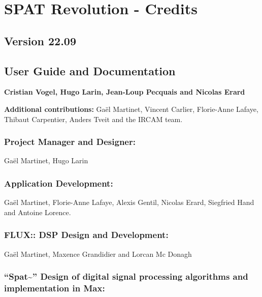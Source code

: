 \documentclass[
  letterpaper,
  DIV=11,
  numbers=noendperiod]{scrreport}
\begin{document}

\hypertarget{spat-revolution---credits}{%
\chapter{SPAT Revolution - Credits}\label{spat-revolution---credits}}

\hypertarget{version-22.09}{%
\section{Version 22.09}\label{version-22.09}}

\hypertarget{user-guide-and-documentation}{%
\section{User Guide and
Documentation}\label{user-guide-and-documentation}}

\textbf{Cristian Vogel, Hugo Larin, Jean-Loup Pecquais and Nicolas
Erard}

\textbf{Additional contributions:} Gaël Martinet, Vincent Carlier,
Florie-Anne Lafaye, Thibaut Carpentier, Anders Tveit and the IRCAM team.

\hypertarget{project-manager-and-designer}{%
\subsection{Project Manager and
Designer:}\label{project-manager-and-designer}}

Gaël Martinet, Hugo Larin

\hypertarget{application-development}{%
\subsection{Application Development:}\label{application-development}}

Gaël Martinet, Florie-Anne Lafaye, Alexis Gentil, Nicolas Erard,
Siegfried Hand and Antoine Lorence.

\hypertarget{flux-dsp-design-and-development}{%
\subsection{FLUX:: DSP Design and
Development:}\label{flux-dsp-design-and-development}}

Gaël Martinet, Maxence Grandidier and Lorcan Mc Donagh

\hypertarget{spat-design-of-digital-signal-processing-algorithms-and-implementation-in-max}{%
\subsection{\texorpdfstring{``Spat\textasciitilde{}'' Design of digital
signal processing algorithms and implementation in
Max:}{``Spat\textasciitilde'' Design of digital signal processing algorithms and implementation in Max:}}\label{spat-design-of-digital-signal-processing-algorithms-and-implementation-in-max}}
\end{document}
